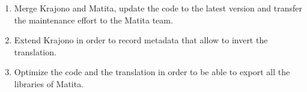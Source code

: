 




\begin{enumerate}

  \item Merge Krajono and Matita, update the code to the latest
  version and transfer the maintenance effort to the Matita team.

  \item Extend Krajono in order to record metadata that allow to
  invert the translation.

  \item Optimize the code and the translation in order to be able to
  export all the libraries of Matita.
\end{enumerate}

